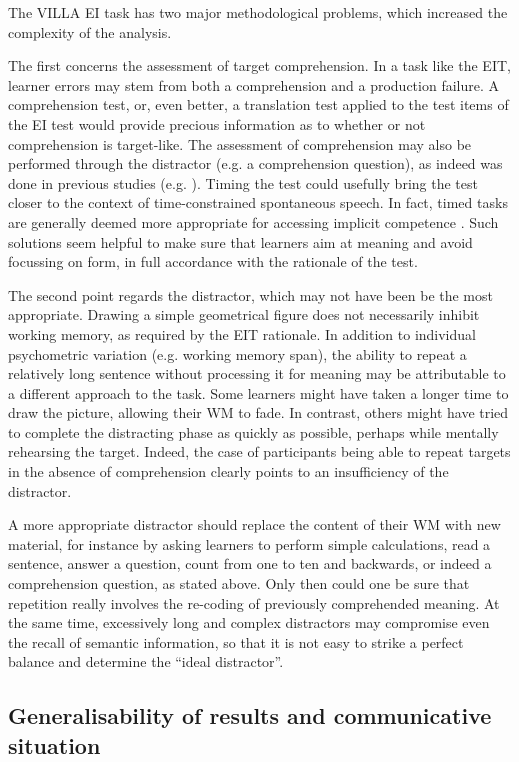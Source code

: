 The VILLA EI task has two major methodological problems, which increased the complexity of the analysis.

The first concerns the assessment of target comprehension. In a task like the EIT, learner errors may stem from both a comprehension and a production failure. A comprehension test, or, even better, a translation test applied to the test items of the EI test would provide precious information as to whether or not comprehension is target-like. The assessment of comprehension may also be performed through the distractor (e.g. a comprehension question), as indeed was done in previous studies (e.g. \citealt{Erlam2006}). Timing the test could usefully bring the test closer to the context of time-constrained spontaneous speech. In fact, timed tasks are generally deemed more appropriate for accessing implicit competence \citep{Ellis2005}. Such solutions seem helpful to make sure that learners aim at meaning and avoid focussing on form, in full accordance with the rationale of the test.

The second point regards the distractor, which may not have been be the most appropriate. Drawing a simple geometrical figure does not necessarily inhibit working memory, as required by the EIT rationale. In addition to individual psychometric variation (e.g. working memory span), the ability to repeat a relatively long sentence without processing it for meaning may be attributable to a different approach to the task. Some learners might have taken a longer time to draw the picture, allowing their WM to fade. In contrast, others might have tried to complete the distracting phase as quickly as possible, perhaps while mentally rehearsing the target. Indeed, the case of participants being able to repeat targets in the absence of comprehension clearly points to an insufficiency of the distractor. 

A more appropriate distractor should replace the content of their WM with new material, for instance by asking learners to perform simple calculations, read a sentence, answer a question, count from one to ten and backwards, or indeed a comprehension question, as stated above. Only then could one be sure that repetition really involves the re-coding of previously comprehended meaning. At the same time, excessively long and complex distractors may compromise even the recall of semantic information, so that it is not easy to strike a perfect balance and determine the “ideal distractor”.

\subsection{Generalisability of results and communicative situation}\label{sec:08:6.2}

